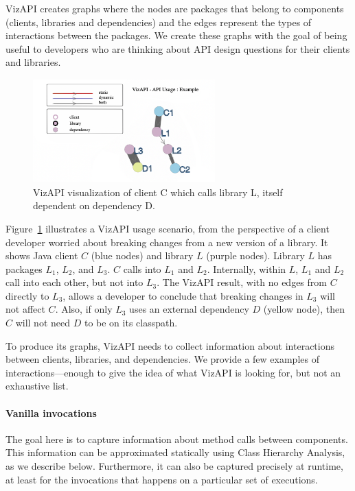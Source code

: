 VizAPI creates graphs where the nodes are packages that belong to components (clients, libraries and dependencies) and the edges represent the types of interactions between the packages. We create these graphs with the goal of being useful to developers who are thinking about API design questions for their clients and libraries.

\begin{figure}[h]
\begin{center}
\includegraphics[height=4cm,width=7cm]{images/intro-example.png}
\caption{VizAPI visualization of client C which calls library L, itself dependent on dependency D.}
\label{fig:example}
\end{center}
\end{figure}

Figure~\ref{fig:example} illustrates a VizAPI usage scenario, from the perspective of a client developer worried about breaking changes from a new version of a library. It shows Java client $C$ (blue nodes) and library $L$ (purple nodes). Library $L$ has packages $L_1$, $L_2$, and $L_3$. $C$ calls into $L_1$ and $L_2$. Internally, within $L$, $L_1$ and $L_2$ call into each other, but not into $L_3$. The VizAPI result, with no edges from $C$ directly to $L_3$, allows a developer to conclude that breaking changes in $L_3$ will not affect $C$. Also, if only $L_3$ uses an external dependency $D$ (yellow node), then $C$ will not need $D$ to be on its classpath.

To produce its graphs, VizAPI needs to collect information about interactions between clients, libraries, and dependencies. We provide a few examples of interactions---enough to give the idea of what VizAPI is looking for, but not an exhaustive list.

\paragraph{Vanilla invocations} The goal here is to capture information about method calls between components. This information can be approximated statically using Class Hierarchy Analysis, as we describe below. Furthermore, it can also be captured precisely at runtime, at least for the invocations that happens on a particular set of executions.

